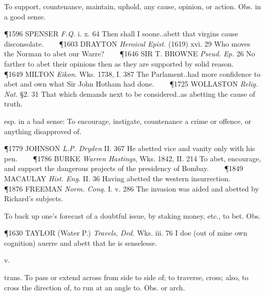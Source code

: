 \begin{description}[wide, labelwidth=!, labelindent=0pt]
\begin{myenumerate}
 To support, countenance, maintain, uphold, any cause, opinion, or action. Obs. in a good sense.

\P 1596 SPENSER  \textit{F.Q.} i. x. 64 Then shall I soone..abett that virgins cause disconsolate.    
\P 1603 DRAYTON  \textit{Heroical Epist.} (1619) xvi. 29 Who moves the Norman to abet our Warre?    
\P 1646 SIR T. BROWNE  \textit{Pseud. Ep.} 26 No farther to abet their opinions then as they are supported by solid reason.    
\P 1649 MILTON  \textit{Eikon.} Wks. 1738, I. 387 The Parlament..had more confidence to abet and own what Sir John Hotham had done.    
\P 1725 WOLLASTON  \textit{Relig. Nat.} §2. 31 That which demands next to be considered..as abetting the cause of truth.

 esp. in a bad sense: To encourage, instigate, countenance a crime or offence, or anything disapproved of.

\P 1779 JOHNSON  \textit{L.P. Dryden} II. 367 He abetted vice and vanity only with his pen.    
\P 1786 BURKE  \textit{Warren Hastings}, Wks. 1842, II. 214 To abet, encourage, and support the dangerous projects of the presidency of Bombay.    
\P 1849 MACAULAY  \textit{Hist. Eng.} II. 36 Having abetted the western insurrection.    
\P 1876 FREEMAN  \textit{Norm. Conq.} I. v. 286 The invasion was aided and abetted by Richard's subjects.

 To back up one's forecast of a doubtful issue, by staking money, etc., to bet. Obs.

\P 1630 TAYLOR  (Water P.) \textit{Travels, Ded.} Wks. iii. 76 I doe (out of mine own cognition) auerre and abett that he is senselesse.



\end{myenumerate}


 v.

\noindent {}

\vspace{-0.3cm}

\begin{myenumerate}

 trans. To pass or extend across from side to side of; to traverse, cross; also, to cross the direction of, to run at an angle to. Obs. or arch.


\end{myenumerate}
\end{description}
